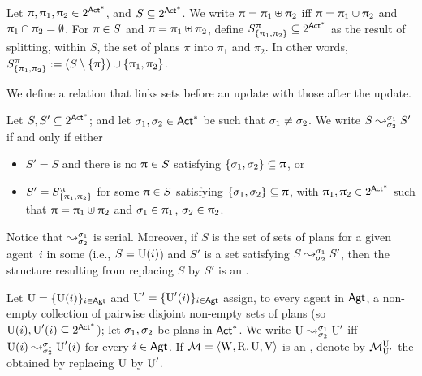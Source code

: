 
\medskip

\begin{definition}
Let $\plans, \plans_1, \plans_2 \in 2^{\ACT^*}$, and $S \subseteq 2^{\ACT^*}$.  We write $\plans = \plans_1\uplus\plans_2$ iff $\plans=\plans_1\cup\plans_2$ and $\plans_1\cap\plans_2=\emptyset$.
For $\plans \in S$ and $\plans=\plans_1\uplus\plans_2$, define  $\lmodel{S}{\plans}{\set{\plans_1,\plans_2}} \subseteq 2^{\ACT^*}$ as the result of splitting, within $S$, the set of plans $\pi$ into $\pi_1$ and $\pi_2$. In other words, $\lmodel{S}{\plans}{\set{\plans_1,\plans_2}} := (S\setminus\set{\plans})\cup\set{\plans_1,\plans_2}$.
\end{definition}

\medskip

We define a relation that links sets before an update with those after the update.

\medskip

\begin{definition}\label{def:splitstr}
Let $S,S' \subseteq 2^{\ACT^*}$; and let $\plan_1,\plan_2 \in \ACT^*$ be such that $\plan_1\neq\plan_2$.
We write $\splitstr{S}{S'}{\plan_1}{\plan_2}$ if and only if either
\begin{itemize} \itemsep 0cm
\item $S' = S$ and there is no $\plans\in S$ satisfying $\set{\plan_1, \plan_2} \subseteq \plans$, or
\item $S' = \lmodel{S}{\plans}{\set{\plans_1,\plans_2}}$ for some $\plans \in S$ satisfying $\set{\plan_1, \plan_2} \subseteq \plans$, with $\plans_1, \plans_2 \in 2^{\ACT^*}$ such that
$\plans = \plans_1\uplus\plans_2$ and
$\plan_1 \in \plans_1$, $\plan_2 \in \plans_2$.
\end{itemize}
\end{definition}

\medskip

Notice that $\splitstr{}{}{\plan_1}{\plan_2}$ is serial. Moreover, if $S$ is the set of sets of plans for a given agent~$i$ in some \ults (i.e., $S=\Unc(i)$) and $S'$ is a set satisfying $\splitstr{S}{S'}{\plan_1}{\plan_2}$, then the structure resulting from replacing $S$ by $S'$ is an \ults.

\medskip

\begin{definition}
  Let $\Unc=\set{\Unc(i)}_{i\in\AGT}$ and $\Unc'=\set{\Unc'(i)}_{i\in\AGT}$ assign, to every agent in $\AGT$, a non-empty
collection of pairwise disjoint non-empty sets of plans (so $\Unc(i), \Unc'(i) \subseteq 2^{\ACT^*}$); let $\plan_1,\plan_2$ be plans in $\ACT^*$. We write $\splitstr{\Unc}{\Unc'}{\plan_1}{\plan_2}$ iff $\splitstr{\Unc(i)}{\Unc'(i)}{\plan_1}{\plan_2}$ for every $i\in\AGT$. If $\modults=\tup{\W,\R,\Unc,\V}$ is an \ults, denote by $\modults^{\Unc}_{\Unc'}$ the \ults obtained by replacing $\Unc$ by $\Unc'$.

\end{definition}

